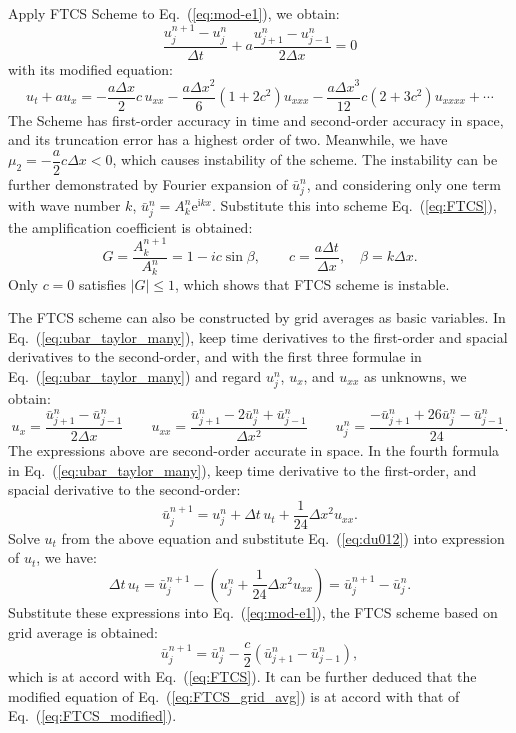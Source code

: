 \documentclass[]{article}
\newcommand{\me}{\mathrm{e}}
\newcommand{\mi}{\mathrm{i}}
\begin{document}
Apply FTCS Scheme to Eq.~(\ref{eq:mod-e1}), we obtain:
\begin{equation}
    \dfrac{u_j^{n+1}-u_j^n}{\Delta t}+a\dfrac{u_{j+1}^n-u_{j-1}^n}{2\Delta x}=0
    \label{eq:FTCS}
\end{equation}
with its modified equation:
\begin{equation}
    u_t+au_x=-\dfrac{a\Delta x}{2}c\, u_{xx}-\dfrac{a\Delta x^2}{6}(1+2c^2)u_{xxx} -\dfrac{a\Delta x^3}{12}c(2+3c^2)u_{xxxx}+\cdots
    \label{eq:FTCS_modified}
\end{equation}
The Scheme has first-order accuracy in time and second-order accuracy
in space, and its truncation error has a highest order of
two. Meanwhile, we have $\mu_2 = -\dfrac{a}{2}c\Delta x<0$, which
causes instability of the scheme. The instability can be further
demonstrated by Fourier expansion of $\bar u_j^n$, and considering
only one term with wave number $k$, $\bar u_j^n=A_k^n\me^{\mi
kx}$. Substitute this into scheme Eq.~(\ref{eq:FTCS}), the amplification
coefficient is obtained:
\begin{equation}
    G=\frac{A_k^{n+1}}{A_k^n}=1-ic\sin \beta,
    \qquad
    c=\frac{a\Delta t}{\Delta x},\quad \beta=k\Delta x.
    \label{eq:FTCSG} 
\end{equation}
Only $c=0$ satisfies $|G|\leq 1$, which shows that FTCS scheme is
instable.

The FTCS scheme can also be constructed by grid averages as basic
variables. In Eq.~(\ref{eq:ubar_taylor_many}), keep time derivatives
to the first-order and spacial derivatives to the second-order, and
with the first three formulae in Eq.~(\ref{eq:ubar_taylor_many}) and
regard $u_j^n$, $u_x$, and $u_{xx}$ as unknowns, we obtain:
\begin{equation}
    u_x = \frac{\bar u_{j+1}^n-\bar u_{j-1}^n}{2\Delta x} \qquad
    u_{xx} = \frac{\bar u_{j+1}^n-2\bar u_j^n+\bar u_{j-1}^n}{\Delta x^2} \qquad
    u_j^n = \frac{-\bar u_{j+1}^n + 26\bar u_j^n - \bar u_{j-1}^n}{24}.
    \label{eq:du012}
\end{equation}
The expressions above are second-order accurate in space. In the
fourth formula in Eq.~(\ref{eq:ubar_taylor_many}), keep time
derivative to the first-order, and spacial derivative to the 
second-order:
\[
    \bar u_{j}^{n+1} = u_j^n+\Delta t\, u_t + \frac{1}{24} \Delta x^2 u_{xx}.
\]
Solve $u_t$ from the above equation and substitute
Eq.~(\ref{eq:du012}) into expression of $u_t$, we have:
\[
    \Delta t\, u_t =  \bar u_j^{n+1}-\left(u_j^n +\frac{1}{24} \Delta x^2
    u_{xx}\right) = \bar u_j^{n+1}- \bar u_{j}^n.
\]
Substitute these expressions into Eq.~(\ref{eq:mod-e1}), the FTCS
scheme based on grid average is obtained:
\begin{equation}
    \bar u_j^{n+1} = \bar u_j^n - \frac{c}{2} \left(\bar u_{j+1}^n-\bar u_{j-1}^n\right),
    \label{eq:FTCS_grid_avg}
\end{equation}
which is at accord with Eq.~(\ref{eq:FTCS}). It can be further deduced
that the modified equation of Eq.~(\ref{eq:FTCS_grid_avg}) is at
accord with that of Eq.~(\ref{eq:FTCS_modified}).
\end{document}
